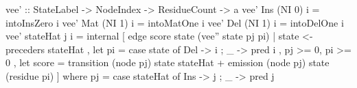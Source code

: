 vee' :: StateLabel -> NodeIndex -> ResidueCount -> a
vee' Ins (NI 0) i = intoInsZero i
vee' Mat (NI 1) i = intoMatOne i
vee' Del (NI 1) i = intoDelOne i
vee' stateHat j i =
  internal [ edge score state (vee'' state pj pi)
           | state <- preceders stateHat
           , let pi = case state of { Del -> i ; _ -> pred i }
           , pj >= 0, pi >= 0
           , let score = transition (node pj) state stateHat
                         + emission (node pj) state (residue pi)
           ]
  where pj = case stateHat of { Ins -> j ; _ -> pred j }
